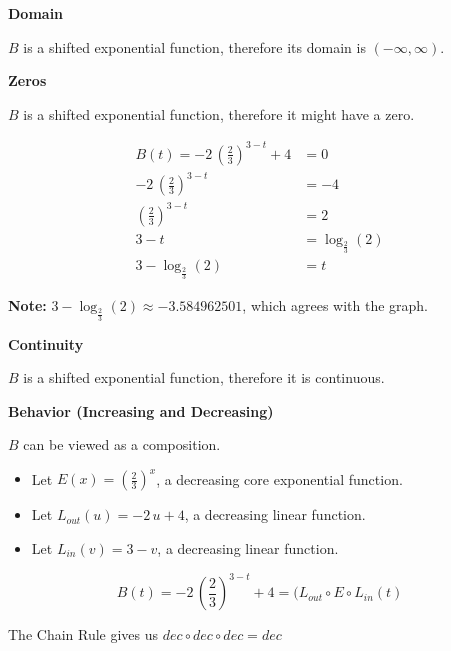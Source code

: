 \documentclass{ximera}
\begin{document}
\begin{example}
\textbf{Domain}

$B$ is a shifted exponential function, therefore its domain is $(-\infty, \infty)$. 




\textbf{Zeros}

$B$ is a shifted exponential function, therefore it might have a zero. 








\begin{align*}
B(t) = -2 \, \left( \frac{2}{3} \right)^{3-t} + 4 & = 0 \\
-2 \, \left( \frac{2}{3} \right)^{3-t}            & = -4  \\
\left( \frac{2}{3} \right)^{3-t}                  & = 2  \\
3 - t                               & = \log_{\tfrac{2}{3}}(2)  \\
3 - \log_{\tfrac{2}{3}}(2)                        & = t
\end{align*}




\textbf{Note:} $3 - \log_{\tfrac{2}{3}}(2) \approx -3.584962501$, which agrees with the graph. 







\textbf{Continuity}

$B$ is a shifted exponential function, therefore it is continuous. 






\textbf{Behavior (Increasing and  Decreasing)} 

$B$ can be viewed as a composition.



\begin{itemize}
  \item Let $E(x) = \left( \frac{2}{3} \right)^x$, a decreasing core exponential function.
  \item Let $L_{out}(u) = -2\,u+4$, a decreasing linear function.
  \item Let $L_{in}(v) = 3-v$, a decreasing linear function.
\end{itemize}

\[
B(t) = -2 \, \left( \frac{2}{3} \right)^{3-t} + 4 = (L_{out} \circ E \circ L_{in}(t)
\]

The Chain Rule gives us $dec \circ dec \circ dec = dec$



\end{example}
\end{document}
